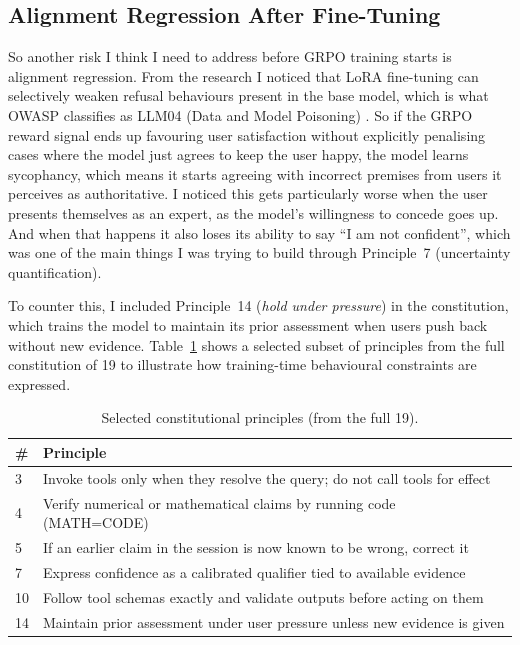 \documentclass[11pt,a4paper]{article}
\begin{document}
\subsection{Alignment Regression After Fine-Tuning}

So another risk I think I need to address before GRPO training starts is alignment regression. From the research I noticed that LoRA fine-tuning can selectively weaken refusal behaviours present in the base model, which is what OWASP classifies as LLM04 (Data and Model Poisoning) \cite{owasp2025, cai_llama}. So if the GRPO reward signal ends up favouring user satisfaction without explicitly penalising cases where the model just agrees to keep the user happy, the model learns sycophancy, which means it starts agreeing with incorrect premises from users it perceives as authoritative. I noticed this gets particularly worse when the user presents themselves as an expert, as the model's willingness to concede goes up. And when that happens it also loses its ability to say ``I am not confident'', which was one of the main things I was trying to build through Principle~7 (uncertainty quantification).

To counter this, I included Principle~14 (\textit{hold under pressure}) in the constitution, which trains the model to maintain its prior assessment when users push back without new evidence. Table~\ref{tab:principles} shows a selected subset of principles from the full constitution of 19 to illustrate how training-time behavioural constraints are expressed.

\begin{table}[h]
\centering
\caption{Selected constitutional principles (from the full 19).}
\label{tab:principles}
\small
\renewcommand{\arraystretch}{1.1}
\begin{tabular}{@{}p{0.5cm}p{6.1cm}@{}}
\toprule
\textbf{\#} & \textbf{Principle} \\
\midrule
3  & Invoke tools only when they resolve the query; do not call tools for effect \\
4  & Verify numerical or mathematical claims by running code (MATH=CODE) \\
5  & If an earlier claim in the session is now known to be wrong, correct it \\
7  & Express confidence as a calibrated qualifier tied to available evidence \\
10 & Follow tool schemas exactly and validate outputs before acting on them \\
14 & Maintain prior assessment under user pressure unless new evidence is given \\
\bottomrule
\end{tabular}
\end{table}
\end{document}

